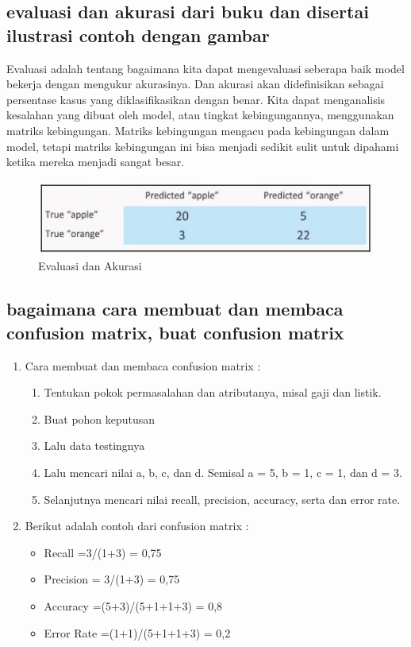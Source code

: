 \subsection{evaluasi dan akurasi dari buku dan disertai ilustrasi contoh
dengan gambar}

\par Evaluasi adalah tentang bagaimana kita dapat mengevaluasi seberapa baik model bekerja dengan mengukur akurasinya. Dan akurasi akan didefinisikan sebagai persentase kasus yang diklasifikasikan dengan benar. Kita dapat menganalisis kesalahan yang dibuat oleh model, atau tingkat kebingungannya, menggunakan matriks kebingungan. Matriks kebingungan mengacu pada kebingungan dalam model, tetapi matriks kebingungan ini bisa menjadi sedikit sulit untuk dipahami ketika mereka menjadi sangat besar.

\begin{figure}[ht]
\centering
\includegraphics[scale=0.5]{figures/f9.jpg}
\caption{ Evaluasi dan Akurasi}
\label{contoh}
\end{figure}

\subsection{ bagaimana cara membuat dan membaca confusion matrix, buat confusion matrix }
\begin{enumerate}
\item Cara membuat dan membaca confusion matrix :
\begin{enumerate}
\item Tentukan pokok permasalahan dan atributanya, misal gaji dan listik.
\item Buat pohon keputusan
\item Lalu data testingnya
\item Lalu mencari nilai a, b, c, dan d. Semisal a = 5, b = 1, c = 1, dan d = 3.
\item Selanjutnya mencari nilai recall, precision, accuracy, serta dan error rate.
\end{enumerate}

\item Berikut adalah contoh dari confusion matrix :
\begin{itemize}
\item Recall =3/(1+3) = 0,75
\item Precision = 3/(1+3) = 0,75
\item Accuracy =(5+3)/(5+1+1+3) = 0,8
\item Error Rate =(1+1)/(5+1+1+3) = 0,2
\end{itemize}
\end{enumerate}



